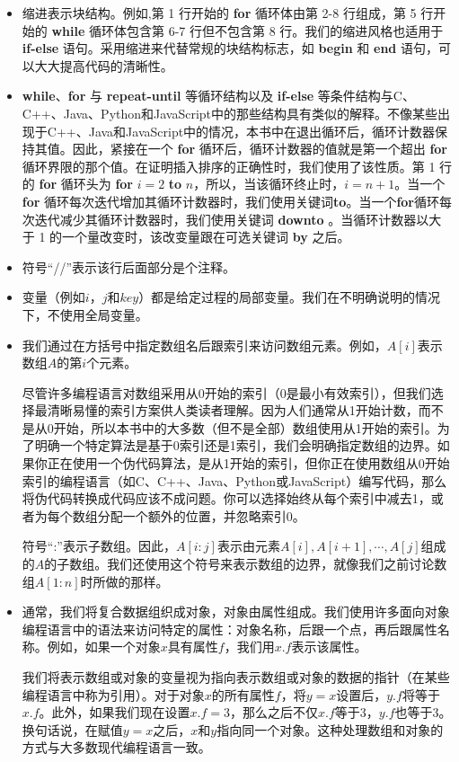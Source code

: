 \documentclass[lang=cn,newtx,10pt,scheme=chinese]{elegantbook}
\begin{document}
\begin{itemize}
    \item 缩进表示块结构。例如,第 1 行开始的 \textbf{for} 循环体由第 2-8 行组成，第 5 行开始的 \textbf{while} 循环体包含第 6-7 行但不包含第 8 行。我们的缩进风格也适用于 \textbf{if-else} 语句。采用缩进来代替常规的块结构标志，如 \textbf{begin} 和 \textbf{end} 语句，可以大大提高代码的清晰性。
    \item \textbf{while}、\textbf{for} 与 \textbf{repeat-until} 等循环结构以及 \textbf{if-else} 等条件结构与C、C++、Java、Python和JavaScript中的那些结构具有类似的解释。不像某些出现于C++、Java和JavaScript中的情况，本书中在退出循环后，循环计数器保持其值。因此，紧接在一个 \textbf{for} 循环后，循环计数器的值就是第一个超出 \textbf{for} 循环界限的那个值。在证明插入排序的正确性时，我们使用了该性质。第 1 行的 \textbf{for} 循环头为 \textbf{for} $i=2$ \textbf{to} $n$，所以，当该循环终止时，$i=n+1$。当一个 \textbf{for} 循环每次迭代增加其循环计数器时，我们使用关键词\textbf{to}。当一个\textbf{for}循环每次迭代减少其循环计数器时，我们使用关键词 \textbf{downto} 。当循环计数器以大于 1 的一个量改变时，该改变量跟在可选关键词 \textbf{by} 之后。
    \item 符号``//''表示该行后面部分是个注释。
    \item 变量（例如$i$，$j$和$key$）都是给定过程的局部变量。我们在不明确说明的情况下，不使用全局变量。
    \item 我们通过在方括号中指定数组名后跟索引来访问数组元素。例如，$A[i]$表示数组$A$的第$i$个元素。

    尽管许多编程语言对数组采用从0开始的索引（0是最小有效索引），但我们选择最清晰易懂的索引方案供人类读者理解。因为人们通常从1开始计数，而不是从0开始，所以本书中的大多数（但不是全部）数组使用从1开始的索引。为了明确一个特定算法是基于0索引还是1索引，我们会明确指定数组的边界。如果你正在使用一个伪代码算法，是从1开始的索引，但你正在使用数组从0开始索引的编程语言（如C、C++、Java、Python或JavaScript）编写代码，那么将伪代码转换成代码应该不成问题。你可以选择始终从每个索引中减去1，或者为每个数组分配一个额外的位置，并忽略索引0。

    符号``:''表示子数组。因此，$A[i:j]$表示由元素$A[i],A[i+1],\cdots,A[j]$组成的$A$的子数组。我们还使用这个符号来表示数组的边界，就像我们之前讨论数组$A[1:n]$时所做的那样。
    \item 通常，我们将复合数据组织成对象，对象由属性组成。我们使用许多面向对象编程语言中的语法来访问特定的属性：对象名称，后跟一个点，再后跟属性名称。例如，如果一个对象$x$具有属性$f$，我们用$x.f$表示该属性。

    我们将表示数组或对象的变量视为指向表示数组或对象的数据的指针（在某些编程语言中称为引用）。对于对象$x$的所有属性$f$，将$y = x$设置后，$y.f$将等于$x.f$。此外，如果我们现在设置$x.f = 3$，那么之后不仅$x.f$等于3，$y.f$也等于3。换句话说，在赋值$y = x$之后，$x$和$y$指向同一个对象。这种处理数组和对象的方式与大多数现代编程语言一致。


\end{itemize}
\end{document}
